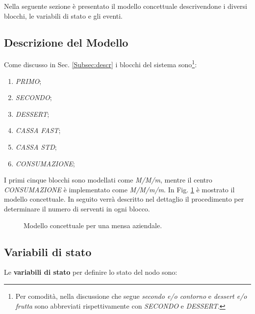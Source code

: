 \documentclass{article}
\begin{document}
Nella seguente sezione è presentato il modello concettuale descrivendone i diversi blocchi, le variabili di stato e gli eventi.

\subsection{Descrizione del Modello}

Come discusso in Sec. \ref{Subsec:descr} i blocchi del sistema sono\footnote{Per comodità, nella discussione che segue \textit{secondo e/o contorno} e \textit{dessert e/o frutta} sono abbreviati rispettivamente con \textit{SECONDO} e \textit{DESSERT}.}: 

\begin{enumerate}
    \item \textit{PRIMO};
    \item \textit{SECONDO};
    \item \textit{DESSERT};
    \item \textit{CASSA FAST};
    \item \textit{CASSA STD};
    \item \textit{CONSUMAZIONE};
\end{enumerate}

I primi cinque blocchi sono modellati come \textit{M/M/m}, mentre il centro \textit{CONSUMAZIONE} è implementato come \textit{M/M/m/m}. In Fig. \ref{fig:diagramma} è mostrato il modello concettuale. In seguito verrà descritto nel dettaglio il procedimento per determinare il numero di serventi in ogni blocco.

\begin{figure}[H]
\centering
 
 \caption{Modello concettuale per una mensa aziendale.}
\label{fig:diagramma}
\end{figure}

\subsection{Variabili di stato}

Le \textbf{variabili di stato} per definire lo stato del nodo sono:
\end{document}
